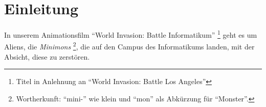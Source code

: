 \section{Einleitung}

In unserem Animationsfilm ``World Invasion: Battle Informatikum'' \footnote{Titel in Anlehnung an ``World Invasion: Battle Los Angeles''} geht es um Aliens, die \textit{Minimons} \footnote{Wortherkunft: ``mini-'' wie klein und ``mon'' als Abkürzung für ``Monster''.}, die auf den Campus des Informatikums landen, mit der Absicht, diese zu zerstören.
